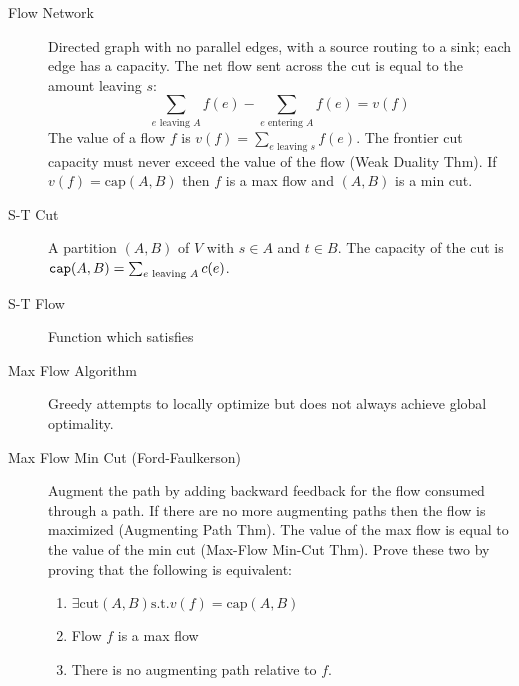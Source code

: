 \documentclass[8pt]{article}
\begin{document}

\begin{multicols}{2}
  \begin{description}
  \item [Flow Network] Directed graph with no parallel edges, with a
    source routing to a sink; each edge has a capacity.
    The net flow sent across the cut is equal to the amount leaving
    $s$:
    $$\sum_{e \text{ leaving } A}f(e) - \sum_{e \text{ entering }
      A}f(e) = v(f)$$
    The value of a flow $f$ is $v(f) = \sum_{e \text{ leaving } s}f(e)$.
    The frontier cut capacity must never exceed the value of the flow
    (Weak Duality Thm).
    If $v(f) = \text{cap}(A,B)$ then $f$ is a max flow and $(A,B)$ is
    a min cut.
  \item [S-T Cut] A partition $(A, B)$ of $V$ with $s \in A$ and $t
    \in B$. The capacity of the cut is $\verb|cap|(A,B)=\sum_{e \text{
      leaving } A}c(e)$.
  \item [S-T Flow] Function which satisfies
  \item [Max Flow Algorithm] Greedy attempts to locally optimize but
    does not always achieve global optimality.
  \item [Max Flow Min Cut (Ford-Faulkerson)] Augment the path by
    adding backward feedback for the flow consumed through a path. If
    there are no more augmenting paths then the flow is maximized
    (Augmenting Path Thm). The value of the max flow is equal to the
    value of the min cut (Max-Flow Min-Cut Thm). Prove these two by
    proving that the following is equivalent:
    \begin{enumerate}
      \item $\exists {} (A,B)  v(f) = (A,B)$
      \item Flow $f$ is a max flow
      \item There is no augmenting path relative to $f$.
    \end{enumerate}
  \end{description} %
\end{multicols}
\end{document}
